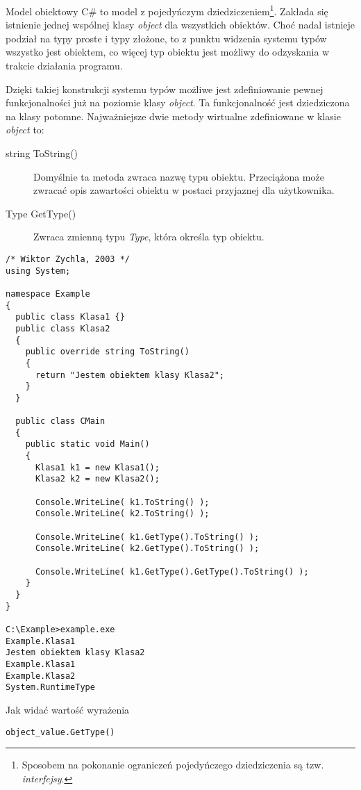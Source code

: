 Model obiektowy C\# to model z pojedyńczym dziedziczeniem\footnote{Sposobem na pokonanie
ograniczeń pojedyńczego dziedziczenia są tzw. {\em interfejsy}.}. Zakłada się istnienie jednej 
wspólnej klasy {\em object} dla wszystkich obiektów. Choć nadal istnieje podział na typy proste i typy
złożone, to z punktu widzenia systemu typów wszystko jest obiektem, co więcej typ obiektu jest możliwy do
odzyskania w trakcie działania programu.

Dzięki takiej konstrukcji systemu typów możliwe jest zdefiniowanie pewnej funkcjonalności już na poziomie
klasy {\em object}. Ta funkcjonalność jest dziedziczona na klasy potomne. Najważniejsze dwie metody
wirtualne zdefiniowane w klasie {\em object} to:

\begin{description}
\item[string ToString()] Domyślnie ta metoda zwraca nazwę typu obiektu. Przeciążona może zwracać opis
zawartości obiektu w postaci przyjaznej dla użytkownika.
\item[Type GetType()] Zwraca zmienną typu {\em Type}, która określa typ obiektu. 
\end{description}

\begin{scriptsize}
\begin{verbatim}
/* Wiktor Zychla, 2003 */
using System;

namespace Example
{
  public class Klasa1 {}
  public class Klasa2 
  {
    public override string ToString()
    {
      return "Jestem obiektem klasy Klasa2";
    } 
  }

  public class CMain
  {
    public static void Main()
    {
      Klasa1 k1 = new Klasa1();
      Klasa2 k2 = new Klasa2();
      
      Console.WriteLine( k1.ToString() );
      Console.WriteLine( k2.ToString() );

      Console.WriteLine( k1.GetType().ToString() );
      Console.WriteLine( k2.GetType().ToString() );

      Console.WriteLine( k1.GetType().GetType().ToString() );
    }
  }
}

C:\Example>example.exe
Example.Klasa1
Jestem obiektem klasy Klasa2
Example.Klasa1
Example.Klasa2
System.RuntimeType
\end{verbatim}
\end{scriptsize}

Jak widać wartość wyrażenia
\begin{scriptsize}
\begin{verbatim}
object_value.GetType()
\end{verbatim}
\end{scriptsize}

